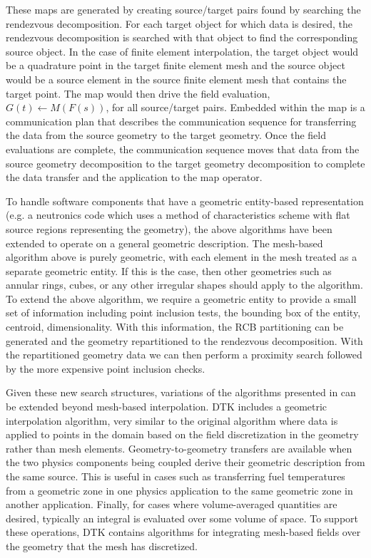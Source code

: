 \documentclass{mc2013}
\begin{document}
These maps are generated by creating source/target pairs found by
searching the rendezvous decomposition. For each target object for
which data is desired, the rendezvous decomposition is searched with
that object to find the corresponding source object. In the case of
finite element interpolation, the target object would be a quadrature
point in the target finite element mesh and the source object would be
a source element in the source finite element mesh that contains the
target point. The map would then drive the field evaluation,
$G(t)\leftarrow M(F(s))$, for all source/target pairs. Embedded within
the map is a communication plan that describes the communication
sequence for transferring the data from the source geometry to the
target geometry. Once the field evaluations are complete, the
communication sequence moves that data from the source geometry
decomposition to the target geometry decomposition to complete the
data transfer and the application to the map operator.

\label{subsec:general_geometry}

To handle software components that have a geometric entity-based
representation (e.g. a neutronics code which uses a method of
characteristics scheme with flat source regions representing the
geometry), the above algorithms have been extended to operate on a
general geometric description. The mesh-based algorithm above is
purely geometric, with each element in the mesh treated as a separate
geometric entity. If this is the case, then other geometries such as
annular rings, cubes, or any other irregular shapes should apply to
the algorithm. To extend the above algorithm, we require a geometric
entity to provide a small set of information including point inclusion
tests, the bounding box of the entity, centroid, dimensionality. With
this information, the RCB partitioning can be generated and the
geometry repartitioned to the rendezvous decomposition. With the
repartitioned geometry data we can then perform a proximity search
followed by the more expensive point inclusion checks.

Given these new search structures, variations of the algorithms
presented in \cite{Plimpton_2004} can be extended beyond mesh-based
interpolation. DTK includes a geometric interpolation algorithm, very
similar to the original algorithm where data is applied to points in
the domain based on the field discretization in the geometry rather
than mesh elements. Geometry-to-geometry transfers are available when
the two physics components being coupled derive their geometric
description from the same source. This is useful in cases such as
transferring fuel temperatures from a geometric zone in one physics
application to the same geometric zone in another
application. Finally, for cases where volume-averaged quantities are
desired, typically an integral is evaluated over some volume of
space. To support these operations, DTK contains algorithms for
integrating mesh-based fields over the geometry that the mesh has
discretized.
\end{document}
